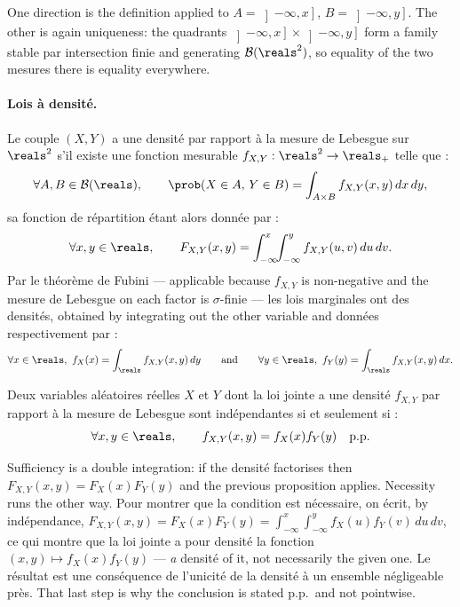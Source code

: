 \begin{remark}
  One direction is the definition applied to
  $A = \left]-\infty,x\right]$, $B = \left]-\infty,y\right]$. The other is again
  uniqueness: the quadrants
  $\left]-\infty,x\right] \times \left]-\infty,y\right]$ form a family stable par
  intersection finie and generating $\mathcal{B}(\reals^{2})$, so equality of the
  two mesures there is equality everywhere.
\end{remark}

\paragraph{Lois à densité.}
Le couple $(X,Y)$ a une densité par rapport à la mesure de Lebesgue sur
$\reals^{2}$ s'il existe une fonction mesurable
$f_{X,Y} : \reals^{2} \to \reals_{+}$ telle que :
\[
  \forall A,B \in \mathcal{B}(\reals), \qquad
  \prob(X \in A,\, Y \in B) = \int_{A \times B} f_{X,Y}(x,y)\,dx\,dy ,
\]
sa fonction de répartition étant alors donnée par :
\[
  \forall x,y \in \reals, \qquad
  F_{X,Y}(x,y) = \int_{-\infty}^{x}\!\!\int_{-\infty}^{y} f_{X,Y}(u,v)\,du\,dv .
\]
Par le théorème de Fubini --- applicable because $f_{X,Y}$ is non-negative and
the mesure de Lebesgue on each factor is $\sigma$-finie --- les lois marginales
ont des densités, obtained by integrating out the other variable and données
respectivement par :
\[
  \forall x \in \reals,\ f_{X}(x) = \int_{\reals} f_{X,Y}(x,y)\,dy
  \qquad\text{and}\qquad
  \forall y \in \reals,\ f_{Y}(y) = \int_{\reals} f_{X,Y}(x,y)\,dx .
\]

\begin{prop}
  Deux variables aléatoires réelles $X$ et $Y$ dont la loi jointe a une densité
  $f_{X,Y}$ par rapport à la mesure de Lebesgue sont indépendantes si et seulement
  si :
  \[
    \forall x,y \in \reals, \qquad f_{X,Y}(x,y) = f_{X}(x) f_{Y}(y) \quad \text{p.p.}
  \]
\end{prop}

\begin{remark}
  Sufficiency is a double integration: if the densité factorises then
  $F_{X,Y}(x,y) = F_{X}(x)F_{Y}(y)$ and the previous proposition applies.
  Necessity runs the other way. Pour montrer que la condition est nécessaire, on écrit, by
  indépendance,
  $F_{X,Y}(x,y) = F_{X}(x)F_{Y}(y)
   = \int_{-\infty}^{x}\!\int_{-\infty}^{y} f_{X}(u)f_{Y}(v)\,du\,dv$,
  ce qui montre que la loi jointe a pour densité la fonction
  $(x,y) \mapsto f_{X}(x)f_{Y}(y)$ --- \emph{a} densité of it, not necessarily
  the given one. Le résultat est une conséquence de l'unicité de la densité à un
  ensemble négligeable près. That last step is why the conclusion is stated p.p.\
  and not pointwise.
\end{remark}

